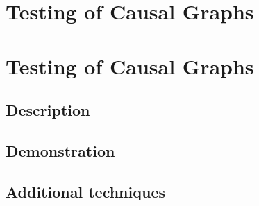 \section{Testing of Causal Graphs}


\section{Testing of Causal Graphs}
\label{sec:graph-testing}


\subsection{Description}
\label{sec:testing-description}


\subsection{Demonstration}
\label{sec:testing-demonstration}


\subsection{Additional techniques}
\label{sec:testing-addendum}
